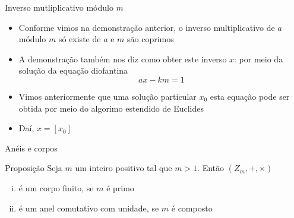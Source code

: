 \begin{frame}[fragile]{Inverso mutliplicativo módulo $m$}

    \begin{itemize}
        \item Conforme vimos na demonstração anterior, o inverso multiplicativo de $a$ módulo $m$ 
            só existe de $a$ e $m$ são coprimos

        \item A demonstração também nos diz como obter este inverso $x$: por meio da solução da
            equação diofantina
        \[
            ax - km = 1
        \]

        \item Vimos anteriormente que uma solução particular $x_0$ esta equação pode ser obtida por
            meio do algorimo estendido de Euclides

        \item Daí, $x = [x_0]$
    \end{itemize}

\end{frame}

\begin{frame}[fragile]{Anéis e corpos}

    \begin{block}{Proposição}
        Seja $m$ um inteiro positivo tal que $m > 1$. Então $(Z_m, +, \times)$
        \begin{enumerate}[(i)]
            \item é um corpo finito, se $m$ é primo
            \item é um anel comutativo com unidade, se $m$ é composto
        \end{enumerate}
    \end{block}

\end{frame}

